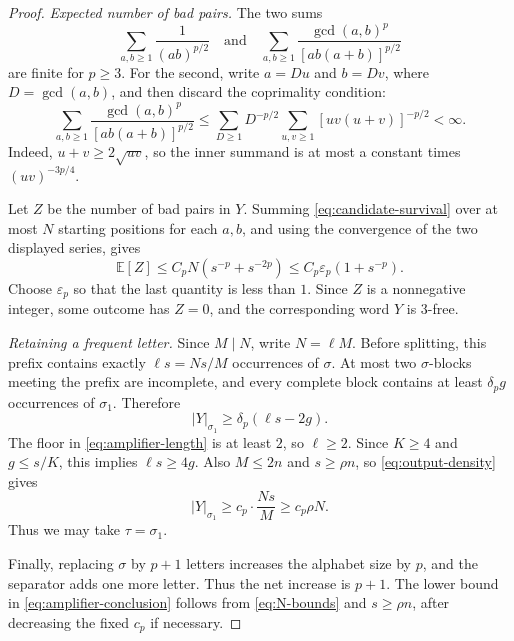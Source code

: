\documentclass[11pt]{article}
\theoremstyle{plain}
\theoremstyle{definition}
\theoremstyle{remark}
\newcommand{\E}{\mathbb E}
\begin{document}
\begin{proof}
\emph{Expected number of bad pairs.}
The two sums
\begin{equation}\label{eq:summable-series}
 \sum_{a,b\ge1}\frac{1}{(ab)^{p/2}}
 \quad\text{and}\quad
 \sum_{a,b\ge1}
 \frac{\gcd(a,b)^p}{[ab(a+b)]^{p/2}}
\end{equation}
are finite for $p\ge3$. For the second, write $a=Du$ and $b=Dv$, where $D=\gcd(a,b)$, and then discard the coprimality condition:
\[
 \sum_{a,b\ge1}
 \frac{\gcd(a,b)^p}{[ab(a+b)]^{p/2}}
 \le
 \sum_{D\ge1}D^{-p/2}
 \sum_{u,v\ge1}[uv(u+v)]^{-p/2}<\infty.
\]
Indeed, $u+v\ge2\sqrt{uv}$, so the inner summand is at most a constant times $(uv)^{-3p/4}$.

Let \(Z\) be the number of bad pairs in \(Y\). Summing \eqref{eq:candidate-survival} over at most \(N\) starting positions for each \(a,b\), and using the convergence of the two displayed series, gives
\begin{equation}\label{eq:expected-bad-pairs}
        \E \left[Z\right]
        \le C_pN(s^{-p}+s^{-2p})
        \le C_p\varepsilon_p(1+s^{-p}).
\end{equation}
Choose \(\varepsilon_p\) so that the last quantity is less than \(1\). Since \(Z\) is a nonnegative integer, some outcome has \(Z=0\), and the corresponding word \(Y\) is 3-free.

\emph{Retaining a frequent letter.}
Since $M\mid N$, write $N=\ell M$. Before splitting, this prefix contains exactly \(\ell s=Ns/M\) occurrences of \(\sigma\). At most two \(\sigma\)-blocks meeting the prefix are incomplete, and every complete block contains at least $\delta_pg$ occurrences of $\sigma_1$. Therefore
\begin{equation}\label{eq:output-density}
        |Y|_{\sigma_1}
        \ge \delta_p(\ell s-2g).
\end{equation}
The floor in \eqref{eq:amplifier-length} is at least \(2\), so \(\ell\ge2\). Since \(K\ge4\) and \(g\le s/K\), this implies \(\ell s\ge4g\). Also \(M\le2n\) and \(s\ge\rho n\), so \eqref{eq:output-density} gives
\[
        |Y|_{\sigma_1}
        \ge c_p\cdot\frac{Ns}{M}
        \ge c_p\rho N.
\]
Thus we may take $\tau=\sigma_1$.

Finally, replacing \(\sigma\) by \(p+1\) letters increases the alphabet size by \(p\), and the separator adds one more letter. Thus the net increase is \(p+1\). The lower bound in \eqref{eq:amplifier-conclusion} follows from \eqref{eq:N-bounds} and \(s\ge\rho n\), after decreasing the fixed \(c_p\) if necessary.
\end{proof}
\end{document}
